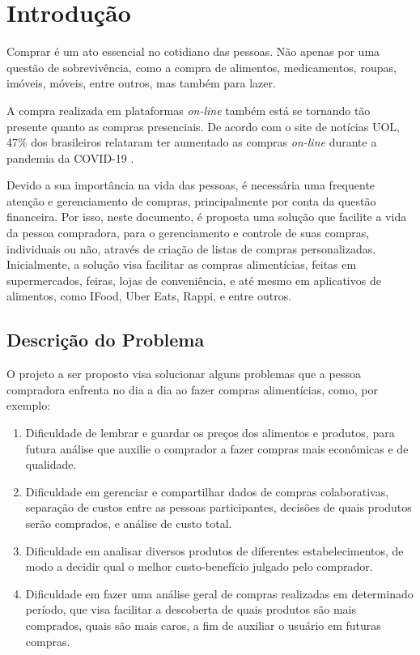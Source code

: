 \chapter{Introdução}
Comprar é um ato essencial no cotidiano das pessoas. Não apenas por uma questão de sobrevivência, como a compra de alimentos, medicamentos, roupas, imóveis, móveis, entre outros, mas também para lazer.

A compra realizada em plataformas \textit{on-line} também está se tornando tão presente quanto as compras presenciais. De acordo com o site de notícias UOL, 47\% dos brasileiros relataram ter aumentado as compras \textit{on-line} durante a pandemia da COVID-19 \cite{Uol2021}.

Devido a sua importância na vida das pessoas, é necessária uma frequente atenção e gerenciamento de compras, principalmente por conta da questão financeira. Por isso, neste documento, é proposta uma solução que facilite a vida da pessoa compradora, para o gerenciamento e controle de suas compras, individuais ou não, através de criação de listas de compras personalizadas. Inicialmente, a solução visa facilitar as compras alimentícias, feitas em supermercados, feiras, lojas de conveniência, e até mesmo em aplicativos de alimentos, como IFood, Uber Eats, Rappi, e entre outros.

\label{sec:descricao}
\section{Descrição do Problema}
O projeto a ser proposto visa solucionar alguns problemas que a pessoa compradora enfrenta no dia a dia ao fazer compras alimentícias, como, por exemplo:
\begin{enumerate}
  \item Dificuldade de lembrar e guardar os preços dos alimentos e produtos, para futura análise que auxilie o comprador a fazer compras mais econômicas e de qualidade.
  \item Dificuldade em gerenciar e compartilhar dados de compras colaborativas, separação de custos entre as pessoas participantes, decisões de quais produtos serão comprados, e análise de custo total.
  \item Dificuldade em analisar diversos produtos de diferentes estabelecimentos, de modo a decidir qual o melhor custo-benefício julgado pelo comprador.
  \item Dificuldade em fazer uma análise geral de compras realizadas em determinado período, que visa facilitar a descoberta de quais produtos são mais comprados, quais são mais caros, a fim de auxiliar o usuário em futuras compras.
\end{enumerate}

